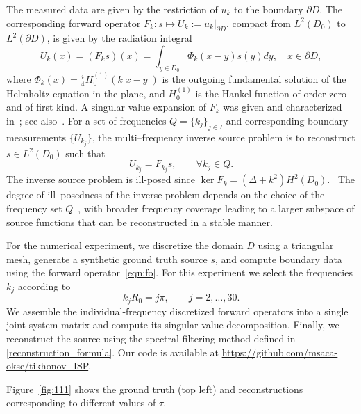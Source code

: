 \documentclass[a4paper]{article}
\def\ker#1{\mathop{\mathrm{ker}}#1}
\begin{document}
The measured data are given by the restriction of $u_k$ to the boundary
$\partial D$. The corresponding forward operator $F_k:s\mapsto U_k:=u_k|_{\partial D}$, compact from $L^2(D_0)$ to $L^2(\partial D)$, is given by the radiation integral
\begin{equation}\label{eqn:fo}
U_k(x)=(F_ks)(x)=\int_{y\in D_0}\Phi_k(x-y)s(y)dy,\quad x\in\partial D,
\end{equation}
where $\Phi_k(x)=\frac{i}{4}H_0^{(1)}(k|x-y|)$ is the outgoing fundamental solution of the
Helmholtz equation in the plane, and $H_0^{(1)}$ is the Hankel function of order zero and of first kind. A singular value expansion of $F_k$ was given and characterized in~\cite{bandwidth}; see also~\cite{Bao-2010}. For a set of frequencies $Q=\{k_j\}_{j\in I}$ and corresponding boundary
measurements $\{U_{k_j}\}$, the multi--frequency inverse source problem is to
reconstruct $s\in L^2(D_0)$ such that
\begin{equation}
U_{k_j}=F_{k_j}s,\qquad \forall k_j\in Q.
\end{equation}
The inverse source problem is ill-posed since $\ker F_k=(\Delta+k^2)H^2(D_0)$.~\cite{ziol} The degree of ill--posedness of the inverse problem depends on the
choice of the frequency set $Q$~\cite{Karamehmedovic_2018}, with broader frequency coverage leading to a larger subspace of source functions that can be
reconstructed in a stable manner.

For the numerical experiment, we discretize the domain $D$ using a triangular mesh, generate a synthetic ground truth source $s$, and compute boundary data using the forward operator~\eqref{eqn:fo}. For this experiment we select the frequencies $k_j$
according to
\begin{equation}
k_jR_0 = j\pi, \qquad j=2,\dots,30.
\end{equation}
We assemble the individual-frequency discretized forward operators into a single joint system matrix and compute its singular value
decomposition. Finally, we reconstruct the source using the spectral filtering method defined in \eqref{reconstruction_formula}. Our code is available at \url{https://github.com/msaca-okse/tikhonov_ISP}. 

Figure~\ref{fig:111} shows the ground truth (top left) and reconstructions corresponding to different values of $\tau$.
\end{document}
